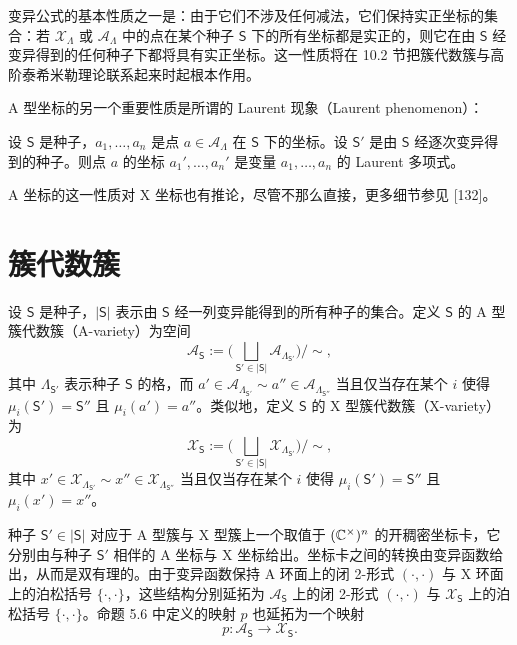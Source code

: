 
变异公式的基本性质之一是：由于它们不涉及任何减法，它们保持实正坐标的集合：若 $\mathcal{X}_\Lambda$ 或 $\mathcal{A}_\Lambda$ 中的点在某个种子 $\mathsf{S}$ 下的所有坐标都是实正的，则它在由 $\mathsf{S}$ 经变异得到的任何种子下都将具有实正坐标。这一性质将在 10.2 节把簇代数簇与高阶泰希米勒理论联系起来时起根本作用。

A 型坐标的另一个重要性质是所谓的 Laurent 现象（Laurent phenomenon）：

\begin{theorem}[{5.11（见 {{{{{[133]}}}}}）}]
设 $\mathsf{S}$ 是种子，$a_1,\dots,a_n$ 是点 $a\in\mathcal{A}_\Lambda$ 在 $\mathsf{S}$ 下的坐标。设 $\mathsf{S}'$ 是由 $\mathsf{S}$ 经逐次变异得到的种子。则点 $a$ 的坐标 $a_1',\dots,a_n'$ 是变量 $a_1,\dots,a_n$ 的 Laurent 多项式。
\end{theorem}

A 坐标的这一性质对 X 坐标也有推论，尽管不那么直接，更多细节参见 [132]。

\section{簇代数簇}

\begin{definition}[5.12]
设 $\mathsf{S}$ 是种子，$|\mathsf{S}|$ 表示由 $\mathsf{S}$ 经一列变异能得到的所有种子的集合。定义 $\mathsf{S}$ 的 A 型簇代数簇（A-variety）为空间
\[
\mathcal{A}_{\mathsf{S}}:=\Big(\bigsqcup_{\mathsf{S}'\in|\mathsf{S}|}\mathcal{A}_{\Lambda_{\mathsf{S}'}}\Big)\Big/\sim,
\]
其中 $\Lambda_{\mathsf{S}'}$ 表示种子 $\mathsf{S}$ 的格，而 $a'\in\mathcal{A}_{\Lambda_{\mathsf{S}'}}\sim a''\in\mathcal{A}_{\Lambda_{\mathsf{S}''}}$ 当且仅当存在某个 $i$ 使得 $\mu_i(\mathsf{S}')=\mathsf{S}''$ 且 $\mu_i(a')=a''$。类似地，定义 $\mathsf{S}$ 的 X 型簇代数簇（X-variety）为
\[
\mathcal{X}_{\mathsf{S}}:=\Big(\bigsqcup_{\mathsf{S}'\in|\mathsf{S}|}\mathcal{X}_{\Lambda_{\mathsf{S}'}}\Big)\Big/\sim,
\]
其中 $x'\in\mathcal{X}_{\Lambda_{\mathsf{S}'}}\sim x''\in\mathcal{X}_{\Lambda_{\mathsf{S}''}}$ 当且仅当存在某个 $i$ 使得 $\mu_i(\mathsf{S}')=\mathsf{S}''$ 且 $\mu_i(x')=x''$。
\end{definition}

种子 $\mathsf{S}'\in|\mathsf{S}|$ 对应于 A 型簇与 X 型簇上一个取值于 $(\mathbb{C}^\times)^n$ 的开稠密坐标卡，它分别由与种子 $\mathsf{S}'$ 相伴的 A 坐标与 X 坐标给出。坐标卡之间的转换由变异函数给出，从而是双有理的。由于变异函数保持 A 环面上的闭 2-形式 $(\cdot,\cdot)$ 与 X 环面上的泊松括号 $\{\cdot,\cdot\}$，这些结构分别延拓为 $\mathcal{A}_{\mathsf{S}}$ 上的闭 2-形式 $(\cdot,\cdot)$ 与 $\mathcal{X}_{\mathsf{S}}$ 上的泊松括号 $\{\cdot,\cdot\}$。命题 5.6 中定义的映射 $p$ 也延拓为一个映射
\[
p:\mathcal{A}_{\mathsf{S}}\to\mathcal{X}_{\mathsf{S}} .
\]

